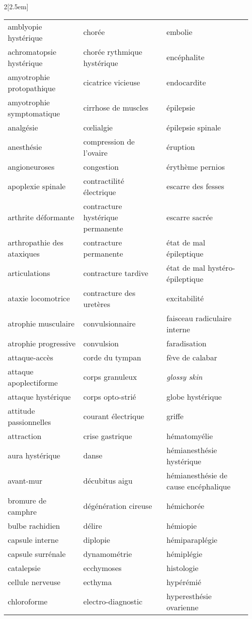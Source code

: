 \begin{multicols}{2}[\columnsep2.5em] 
\begin{table}[H]
\footnotesize
\begin{tabular}{l|l|l}
amblyopie hystérique & chorée & embolie\\
achromatopsie hystérique & chorée rythmique hystérique & encéphalite\\
amyotrophie protopathique & cicatrice vicieuse & endocardite\\
amyotrophie symptomatique & cirrhose de muscles & épilepsie\\
analgésie & c\oe{}lialgie & épilepsie spinale\\
anesthésie & compression de l'ovaire & éruption\\
angioneuroses & congestion & érythème pernios\\
apoplexie spinale & contractilité électrique & escarre des fesses\\
arthrite déformante & contracture hystérique permanente & escarre sacrée\\
arthropathie des ataxiques & contracture permanente & état de mal épileptique\\
articulations & contracture tardive & état de mal hystéro-épileptique\\
ataxie locomotrice & contracture des uretères  & excitabilité\\
atrophie musculaire & convulsionnaire & faisceau radiculaire interne \\
atrophie progressive & convulsion & faradisation\\
attaque-accès & corde du tympan & fève de calabar\\
attaque apoplectiforme & corps granuleux & \textit{glossy skin} \\
attaque hystérique & corps opto-strié & globe hystérique\\
attitude passionnelles & courant électrique & griffe\\
attraction & crise gastrique & hématomyélie\\
aura hystérique & danse & hémianesthésie hystérique\\
avant-mur & décubitus aigu & hémianesthésie de cause encéphalique\\
bromure de camphre & dégénération cireuse & hémichorée\\
bulbe rachidien & délire & hémiopie\\
capsule interne & diplopie & hémiparaplégie\\
capsule surrénale & dynamométrie &  hémiplégie\\
catalepsie & ecchymoses & histologie\\
cellule nerveuse & ecthyma & hypérémié\\
chloroforme & electro-diagnostic & hyperesthésie ovarienne\\
\end{tabular}
\end{table}
\columnbreak
\end{multicols}
\newpage

